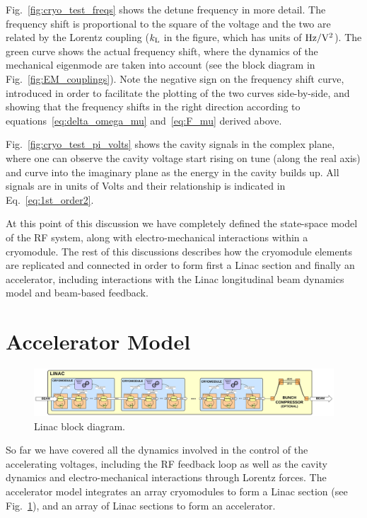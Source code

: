 \documentclass[a4paper,12pt]{article}
\begin{document}
Fig.~\ref{fig:cryo_test_freqs} shows the detune frequency in more detail. The frequency shift is proportional to the square of the voltage and the two are related by the Lorentz coupling ($k_{\rm L}$ in the figure, which has units of $\rm Hz/V^2$). The green curve shows the actual frequency shift, where the dynamics of the mechanical eigenmode are taken into account (see the block diagram in Fig.~\ref{fig:EM_couplings}). Note the negative sign on the frequency shift curve, introduced in order to facilitate the plotting of the two curves side-by-side, and showing that the frequency shifts in the right direction according to equations~\ref{eq:delta_omega_mu} and~\ref{eq:F_mu} derived above.

Fig.~\ref{fig:cryo_test_pi_volts} shows the cavity signals in the complex plane, where one can observe the cavity voltage start rising on tune (along the real axis) and curve into the imaginary plane as the energy in the cavity builds up. All signals are in units of Volts and their relationship is indicated in Eq.~\ref{eq:1st_order2}.

At this point of this discussion we have completely defined the state-space model of the RF system, along with electro-mechanical interactions within a cryomodule. The rest of this discussions describes how the cryomodule elements are replicated and connected in order to form first a Linac section and finally an accelerator, including interactions with the Linac longitudinal beam dynamics model and beam-based feedback.

\clearpage
\newpage

\section{Accelerator Model}

\begin{figure}
\centering
\includegraphics[scale=0.45]{../figures/Linac_block_diagram.png}
\caption{Linac block diagram.}
\label{fig:Linac_block_diagram}
\end{figure}

So far we have covered all the dynamics involved in the control of the accelerating voltages, including the RF feedback loop as well as the cavity dynamics and electro-mechanical interactions through Lorentz forces. The accelerator model integrates an array cryomodules to form a Linac section (see Fig.~\ref{fig:Linac_block_diagram}), and an array of Linac sections to form an accelerator.
\end{document}

